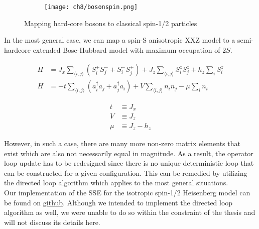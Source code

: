 \begin{figure}[!htb]
    \centering
    \begin{subfigure}[b]{\textwidth}  %
        \centering
        \texttt{[image: ch8/bosonspin.png]}
    \end{subfigure}
    \caption{Mapping hard-core bosons to classical spin-1/2 particles}
    \label{}
\end{figure}
\FloatBarrier \!\!\!\!\!\!\!\!\!\!\!

In the most general case, we can map a spin-S anisotropic XXZ model to a semi-hardcore extended Bose-Hubbard model with maximum occupation of $2S$.

\begin{minipage}{0.7\textwidth}
\begin{align*}
    H &= J_x\sum_{\langle i, j \rangle} (S_i^+ S_j^- + S_i^- S_j^+) +  J_z\sum_{\langle i, j \rangle} S_i^z S_j^z + h_z \sum_i S_i^z\\
    H &= -t \sum_{\langle i, j \rangle}(a_i^{\dagger}a_j + a_j^{\dagger}a_i) + V \sum_{\langle i, j \rangle} n_i n_j - \mu \sum_i n_i
\end{align*}    
\end{minipage}
\begin{minipage}{0.25\textwidth}
    \begin{align*}
        t &\equiv J_x \\
        V &\equiv J_z \\ 
        \mu &\equiv J_z - h_z
    \end{align*}
\end{minipage}

However, in such a case, there are many more non-zero matrix elements that exist which are also not necessarily equal in magnitude. As a result, the operator loop update has to be redesigned since there is no unique deterministic loop that can be constructed for a given configuration. This can be remedied by utilizing the directed loop algorithm\cite{Syljusen_2002} which applies to the most general situations. 
\vspace{0.5cm}\\
Our implementation of the SSE for the isotropic spin-1/2 Heisenberg model can be found on \href{https://github.com/20akshay00/MSThesis}{github}. Although we intended to implement the directed loop algorithm as well, we were unable to do so within the constraint of the thesis and will not discuss its details here. 


